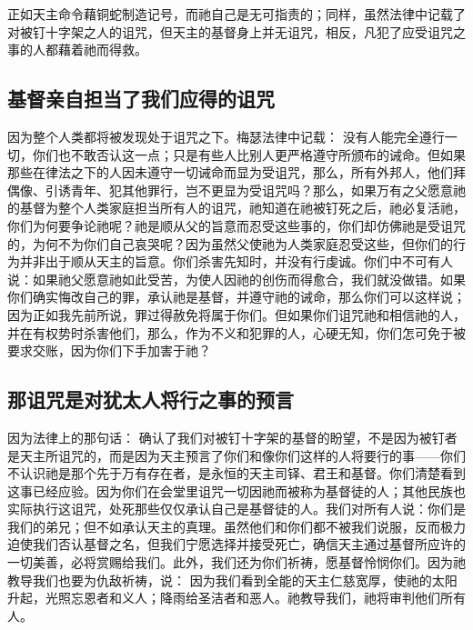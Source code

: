  正如天主命令藉铜蛇制造记号，而祂自己是无可指责的；同样，虽然法律中记载了对被钉十字架之人的诅咒，但天主的基督身上并无诅咒，相反，凡犯了应受诅咒之事的人都藉着祂而得救。\par


\subsection{基督亲自担当了我们应得的诅咒}

 因为整个人类都将被发现处于诅咒之下。梅瑟法律中记载： 没有人能完全遵行一切，你们也不敢否认这一点；只是有些人比别人更严格遵守所颁布的诫命。但如果那些在律法之下的人因未遵守一切诫命而显为受诅咒，那么，所有外邦人，他们拜偶像、引诱青年、犯其他罪行，岂不更显为受诅咒吗？那么，如果万有之父愿意祂的基督为整个人类家庭担当所有人的诅咒，祂知道在祂被钉死之后，祂必复活祂，你们为何要争论祂呢？祂是顺从父的旨意而忍受这些事的，你们却仿佛祂是受诅咒的，为何不为你们自己哀哭呢？因为虽然父使祂为人类家庭忍受这些，但你们的行为并非出于顺从天主的旨意。你们杀害先知时，并没有行虔诚。你们中不可有人说：如果祂父愿意祂如此受苦，为使人因祂的创伤而得愈合，我们就没做错。如果你们确实悔改自己的罪，承认祂是基督，并遵守祂的诫命，那么你们可以这样说；因为正如我先前所说，罪过得赦免将属于你们。但如果你们诅咒祂和相信祂的人，并在有权势时杀害他们，那么，作为不义和犯罪的人，心硬无知，你们怎可免于被要求交账，因为你们下手加害于祂？\par


\subsection{那诅咒是对犹太人将行之事的预言}

 因为法律上的那句话： 确认了我们对被钉十字架的基督的盼望，不是因为被钉者是天主所诅咒的，而是因为天主预言了你们和像你们这样的人将要行的事——你们不认识祂是那个先于万有存在者，是永恒的天主司铎、君王和基督。你们清楚看到这事已经应验。因为你们在会堂里诅咒一切因祂而被称为基督徒的人；其他民族也实际执行这诅咒，处死那些仅仅承认自己是基督徒的人。我们对所有人说：你们是我们的弟兄；但不如承认天主的真理。虽然他们和你们都不被我们说服，反而极力迫使我们否认基督之名，但我们宁愿选择并接受死亡，确信天主通过基督所应许的一切美善，必将赏赐给我们。此外，我们还为你们祈祷，愿基督怜悯你们。因为祂教导我们也要为仇敌祈祷，说： 因为我们看到全能的天主仁慈宽厚，使祂的太阳升起，光照忘恩者和义人；降雨给圣洁者和恶人。祂教导我们，祂将审判他们所有人。\par

